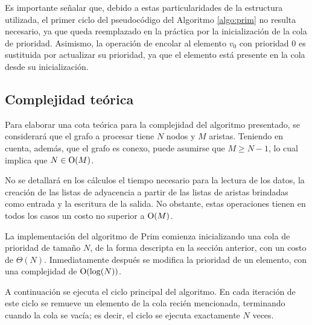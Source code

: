     Es importante señalar que, debido a estas particularidades de la
    estructura utilizada, el primer ciclo del pseudocódigo del Algoritmo
    \ref{algo:prim} no resulta necesario, ya que queda reemplazado en la
    práctica por la inicialización de la cola de prioridad. Asimismo, la
    operación de encolar al elemento $v_0$ con prioridad $0$ es sustituida
    por actualizar su prioridad, ya que el elemento está presente en la cola
    desde su inicialización.

    \subsection{Complejidad teórica}
    Para elaborar una cota teórica para la complejidad del algoritmo
    presentado, se considerará que el grafo a procesar tiene $N$ nodos y $M$
    aristas.
    Teniendo en cuenta, además, que el grafo es conexo, puede asumirse que
    $M \geq N-1$, lo cual implica que $N \in \operatorname{O}(M)$.

    No se detallará en los cálculos el tiempo necesario para la lectura de
    los datos, la creación de las listas de adyacencia a partir de las listas
    de aristas brindadas como entrada y la escritura de la salida. No
    obstante, estas operaciones tienen en todos los casos un costo no
    superior a $\operatorname{O}(M)$.

    \vspace{1.25em}

    La implementación del algoritmo de Prim comienza inicializando una cola
    de prioridad de tamaño $N$, de la forma descripta en la sección anterior,
    con un costo de $\Theta(N)$. Inmediatamente después se modifica la
    prioridad de un elemento, con una complejidad de $\operatorname{O}(\log(N))$.

    A continuación se ejecuta el ciclo principal del algoritmo. En cada
    iteración de este ciclo se remueve un elemento de la cola recién
    mencionada, terminando cuando la cola se vacía; es decir, el ciclo se
    ejecuta exactamente $N$ veces.

